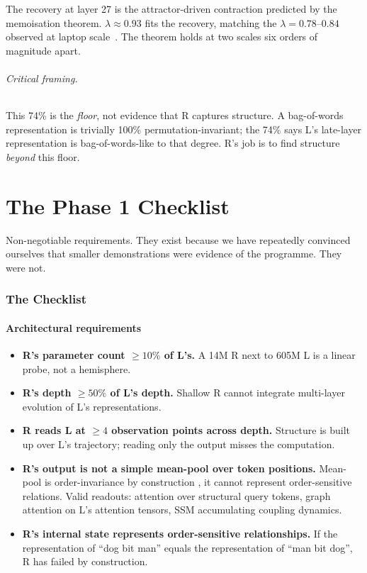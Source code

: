 \documentclass[10pt, twocolumn, a4paper]{article}
\newenvironment{checklist}{\begin{itemize}[leftmargin=2em,labelsep=0.5em,itemsep=2pt]\renewcommand{\labelitemi}{$\square$}}{\end{itemize}}
\begin{document}
The recovery at layer 27 is the attractor-driven contraction predicted by the memoisation theorem. $\lambda \approx 0.93$ fits the recovery, matching the $\lambda = 0.78$--$0.84$ observed at laptop scale~\cite{concept-circuits}. The theorem holds at two scales six orders of magnitude apart.

\paragraph{Critical framing.} This 74\% is the \emph{floor}, not evidence that R captures structure. A bag-of-words representation is trivially 100\% permutation-invariant; the 74\% says L's late-layer representation is bag-of-words-like to that degree. R's job is to find structure \emph{beyond} this floor.


\part{The Phase 1 Checklist}
\label{sec:checklist}

Non-negotiable requirements. They exist because we have repeatedly convinced ourselves that smaller demonstrations were evidence of the programme. They were not.

\section{The Checklist}

\subsection*{Architectural requirements}

\begin{checklist}
\item \textbf{R's parameter count $\geq 10\%$ of L's.} A 14M R next to 605M L is a linear probe, not a hemisphere.
\item \textbf{R's depth $\geq 50\%$ of L's depth.} Shallow R cannot integrate multi-layer evolution of L's representations.
\item \textbf{R reads L at $\geq 4$ observation points across depth.} Structure is built up over L's trajectory; reading only the output misses the computation.
\item \textbf{R's output is not a simple mean-pool over token positions.} Mean-pool is order-invariance by construction ,  it cannot represent order-sensitive relations. Valid readouts: attention over structural query tokens, graph attention on L's attention tensors, SSM accumulating coupling dynamics.
\item \textbf{R's internal state represents order-sensitive relationships.} If the representation of ``dog bit man'' equals the representation of ``man bit dog'', R has failed by construction.
\end{checklist}
\end{document}
